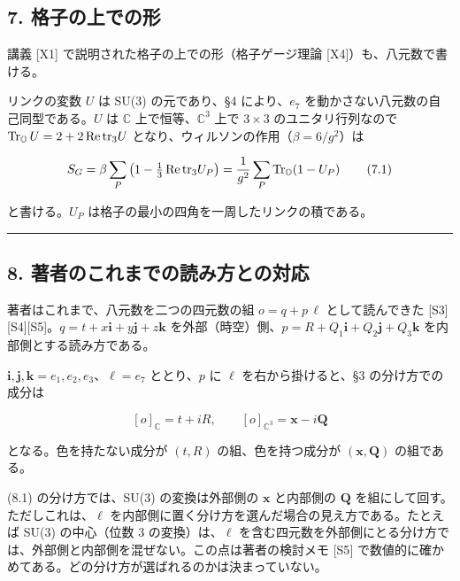 \documentclass[
  a4paper,
]{ltjsarticle}
\begin{document}
\subsection{7.
格子の上での形}\label{ux683cux5b50ux306eux4e0aux3067ux306eux5f62}

講義 {[}X1{]} で説明された格子の上での形（格子ゲージ理論
{[}X4{]}）も、八元数で書ける。

リンクの変数 \(U\) は SU(3) の元であり、§4 により、\(e_7\)
を動かさない八元数の自己同型である。\(U\) は \(\mathbb{C}\)
上で恒等、\(\mathbb{C}^3\) 上で \(3\times3\) のユニタリ行列なので
\({\rm Tr}_{\mathbb O}\,U = 2 + 2\,{\rm Re}\,{\rm tr}_3 U\)
となり、ウィルソンの作用（\(\beta = 6/g^2\)）は

\[
S_G = \beta\sum_P\left(1 - \tfrac13\,{\rm Re}\,{\rm tr}_3 U_P\right) = \frac{1}{g^2}\sum_P {\rm Tr}_{\mathbb O}\!\left(1 - U_P\right) \tag{7.1}
\]

と書ける。\(U_P\) は格子の最小の四角を一周したリンクの積である。

\begin{center}\rule{0.5\linewidth}{0.5pt}\end{center}

\subsection{8.
著者のこれまでの読み方との対応}\label{ux8457ux8005ux306eux3053ux308cux307eux3067ux306eux8aadux307fux65b9ux3068ux306eux5bfeux5fdc}

著者はこれまで、八元数を二つの四元数の組 \(o = q + p\,\ell\)
として読んできた
{[}S3{]}{[}S4{]}{[}S5{]}。\(q = t + x\mathbf{i} + y\mathbf{j} + z\mathbf{k}\)
を外部（時空）側、\(p = R + Q_1\mathbf{i} + Q_2\mathbf{j} + Q_3\mathbf{k}\)
を内部側とする読み方である。

\(\mathbf{i},\mathbf{j},\mathbf{k} = e_1,e_2,e_3\)、\(\ell = e_7\)
ととり、\(p\) に \(\ell\) を右から掛けると、§3 の分け方での成分は

\[
[o]_{\mathbb C} = t + iR,\qquad [o]_{\mathbb C^3} = \mathbf{x} - i\mathbf{Q} \tag{8.1}
\]

となる。色を持たない成分が \((t, R)\) の組、色を持つ成分が
\((\mathbf{x}, \mathbf{Q})\) の組である。

(8.1) の分け方では、SU(3) の変換は外部側の \(\mathbf{x}\) と内部側の
\(\mathbf{Q}\) を組にして回す。ただしこれは、\(\ell\)
を内部側に置く分け方を選んだ場合の見え方である。たとえば SU(3)
の中心（位数 3 の変換）は、\(\ell\)
を含む四元数を外部側にとる分け方では、外部側と内部側を混ぜない。この点は著者の検討メモ
{[}S5{]}
で数値的に確かめてある。どの分け方が選ばれるのかは決まっていない。
\end{document}
